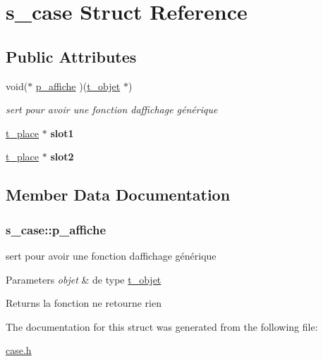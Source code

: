 \hypertarget{structs__case}{}\section{s\+\_\+case Struct Reference}
\label{structs__case}
\subsection*{Public Attributes}
\begin{DoxyCompactItemize}
\item 
void($\ast$ \hyperlink{structs__case_ab72efb72d5e1031d46e96c61c9c2e123}{p\+\_\+affiche} )(\hyperlink{structt__objet}{t\+\_\+objet} $\ast$)
\begin{DoxyCompactList}\small\item\em sert pour avoir une fonction d\textquotesingle{}affichage générique \end{DoxyCompactList}\item 
\hyperlink{structt__place}{t\+\_\+place} $\ast$ {\bfseries slot1}\hypertarget{structs__case_a88358de79f1bfb51549cd344a28fcff6}{}\label{structs__case_a88358de79f1bfb51549cd344a28fcff6}

\item 
\hyperlink{structt__place}{t\+\_\+place} $\ast$ {\bfseries slot2}\hypertarget{structs__case_a101455287fd931e3a5f0ff3ffade4cfc}{}\label{structs__case_a101455287fd931e3a5f0ff3ffade4cfc}

\end{DoxyCompactItemize}


\subsection{Member Data Documentation}
\subsubsection[{\texorpdfstring{p\+\_\+affiche}{p_affiche}}]{\setlength{\rightskip}{0pt plus 5cm}s\+\_\+case\+::p\+\_\+affiche}\hypertarget{structs__case_ab72efb72d5e1031d46e96c61c9c2e123}{}\label{structs__case_ab72efb72d5e1031d46e96c61c9c2e123}


sert pour avoir une fonction d\textquotesingle{}affichage générique 


\begin{DoxyParams}{Parameters}
{\em objet} & de type \hyperlink{structt__objet}{t\+\_\+objet} \\
\hline
\end{DoxyParams}
\begin{DoxyReturn}{Returns}
la fonction ne retourne rien 
\end{DoxyReturn}


The documentation for this struct was generated from the following file\+:\begin{DoxyCompactItemize}
\item 
\hyperlink{case_8h}{case.\+h}\end{DoxyCompactItemize}
